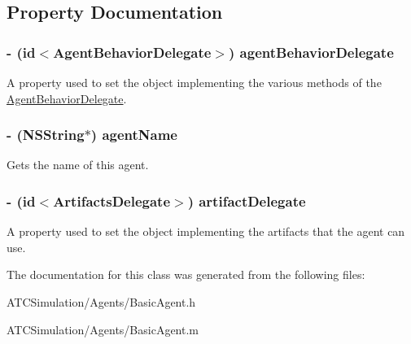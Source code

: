 \subsection{\-Property \-Documentation}
\hypertarget{interface_basic_agent_a05f2c02931ad325b50029b55565d612d}{
\subsubsection[{agent\-Behavior\-Delegate}]{\setlength{\rightskip}{0pt plus 5cm}-\/ (id$<${\bf \-Agent\-Behavior\-Delegate}$>$) agent\-Behavior\-Delegate}}
\label{interface_basic_agent_a05f2c02931ad325b50029b55565d612d}
\-A property used to set the object implementing the various methods of the \hyperlink{protocol_agent_behavior_delegate-p}{\-Agent\-Behavior\-Delegate}. \hypertarget{interface_basic_agent_a763a80618c57ff7402e0f19e1b077eb3}{
\subsubsection[{agent\-Name}]{\setlength{\rightskip}{0pt plus 5cm}-\/ (\-N\-S\-String$\ast$) agent\-Name}}
\label{interface_basic_agent_a763a80618c57ff7402e0f19e1b077eb3}
\-Gets the name of this agent. \hypertarget{interface_basic_agent_a1d96109fc3410b6b23a08296ecc44554}{
\subsubsection[{artifact\-Delegate}]{\setlength{\rightskip}{0pt plus 5cm}-\/ (id$<${\bf \-Artifacts\-Delegate}$>$) artifact\-Delegate}}
\label{interface_basic_agent_a1d96109fc3410b6b23a08296ecc44554}
\-A property used to set the object implementing the artifacts that the agent can use. 

\-The documentation for this class was generated from the following files\-:\begin{DoxyCompactItemize}
\item 
\-A\-T\-C\-Simulation/\-Agents/\-Basic\-Agent.\-h\item 
\-A\-T\-C\-Simulation/\-Agents/\-Basic\-Agent.\-m\end{DoxyCompactItemize}
